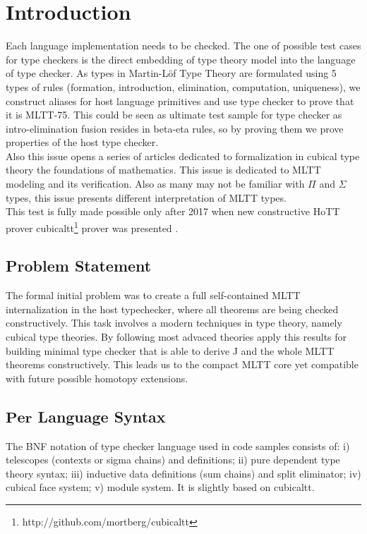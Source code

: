 \documentclass{article}
\theoremstyle{definition}
\begin{document}
\tableofcontents

\section*{Introduction}

Each language implementation needs to be checked. The one of possible test cases
for type checkers is the direct embedding of type theory model into the language of type checker.
As types in Martin-Löf Type Theory \cite{Lof72,Lof84} are formulated using 5 types of rules (formation,
introduction, elimination, computation, uniqueness), we construct aliases
for host language primitives and use type checker to prove that it is MLTT-75.
This could be seen as ultimate test sample for type checker as
intro-elimination fusion resides in beta-eta rules, so by proving them
we prove properties of the host type checker.\\
Also this issue opens a series of articles dedicated to formalization in
cubical type theory the foundations of mathematics. This issue is dedicated
to MLTT modeling and its verification. Also as many may not be familiar with
$\Pi$ and $\Sigma$ types, this issue presents different interpretation of MLTT types.\\
This test is fully made possible only after 2017 when new constructive HoTT \cite{HoTT13} prover cubicaltt\footnote{http://github.com/mortberg/cubicaltt}
prover was presented \cite{Mortberg17}.

\subsection*{Problem Statement}

The formal initial problem was to create a full self-contained MLTT internalization in the host typechecker,
where all theorems are being checked constructively. This task involves a modern techniques in type theory,
namely cubical type theories. By following most advaced theories apply this results for building minimal
type checker that is able to derive J and the whole MLTT theorems constructively. This leads us to the
compact MLTT core yet compatible with future possible homotopy extensions.

\subsection*{$\mathbf{Per}$ Language Syntax}

The BNF notation of type checker language used in code samples consists of:
i) telescopes (contexts or sigma chains) and definitions;
ii) pure dependent type theory syntax;
iii) inductive data definitions (sum chains) and split eliminator;
iv) cubical face system;
v) module system. It is slightly based on cubicaltt.
\end{document}
